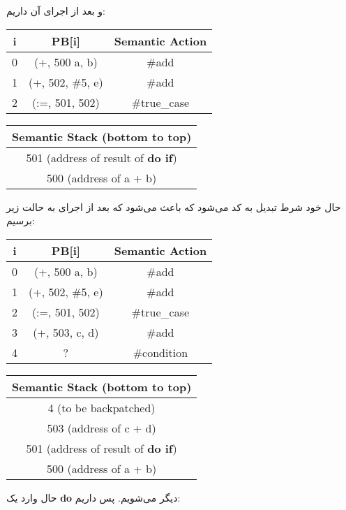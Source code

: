 \documentclass[]{article}
\begin{document}
و بعد از اجرای آن داریم:
\begin{latin}
\centering
\begin{tabular}{|c|c|c|}
    \hline
    i & PB[i] & Semantic Action\\
    \hline
    0 & (+, 500 a, b) & \#add\\
    1 & (+, 502, \#5, e) & \#add\\
    2 & (:=, 501, 502) & \#true\_case\\
    \hline
\end{tabular}
\begin{tabular}{|c|}
    \hline
    Semantic Stack (bottom to top)\\
    \hline
    501 (address of result of \textbf{do if})\\
    \hline
    500 (address of a + b)\\
    \hline
\end{tabular}
\end{latin}
حال خود شرط تبدیل به کد می‌شود که باعث می‌شود که بعد از اجرای
به حالت زیر برسیم:
\begin{latin}
\centering
\begin{tabular}{|c|c|c|}
    \hline
    i & PB[i] & Semantic Action\\
    \hline
    0 & (+, 500 a, b) & \#add\\
    1 & (+, 502, \#5, e) & \#add\\
    2 & (:=, 501, 502) & \#true\_case\\
    3 & (+, 503, c, d) & \#add\\
    4 & ? & \#condition\\
    \hline
\end{tabular}
\begin{tabular}{|c|}
    \hline
    Semantic Stack (bottom to top)\\
    \hline
    4 (to be backpatched)\\
    \hline
    503 (address of c + d)\\
    \hline
    501 (address of result of \textbf{do if})\\
    \hline
    500 (address of a + b)\\
    \hline
\end{tabular}
\end{latin}
حال وارد یک
\textbf{do}
دیگر می‌شویم. پس داریم:
\end{document}
